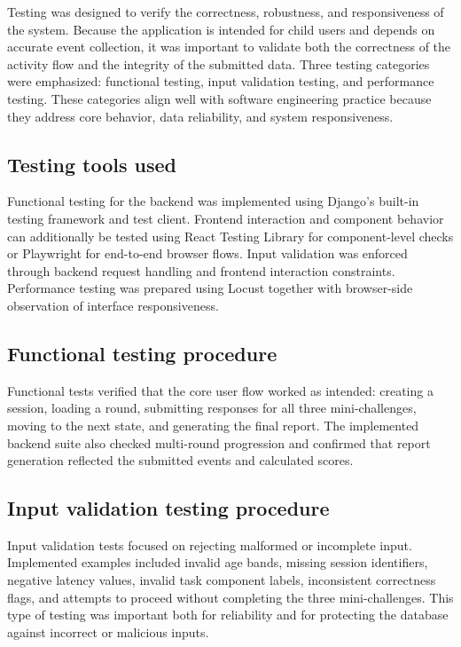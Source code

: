 \documentclass[conference]{IEEEtran}
\begin{document}
Testing was designed to verify the correctness, robustness, and responsiveness of the system. Because the application is intended for child users and depends on accurate event collection, it was important to validate both the correctness of the activity flow and the integrity of the submitted data. Three testing categories were emphasized: functional testing, input validation testing, and performance testing. These categories align well with software engineering practice because they address core behavior, data reliability, and system responsiveness.

\subsection{Testing tools used}

Functional testing for the backend was implemented using Django's built-in testing framework and test client. Frontend interaction and component behavior can additionally be tested using React Testing Library for component-level checks or Playwright for end-to-end browser flows. Input validation was enforced through backend request handling and frontend interaction constraints. Performance testing was prepared using Locust together with browser-side observation of interface responsiveness.

\subsection{Functional testing procedure}

Functional tests verified that the core user flow worked as intended: creating a session, loading a round, submitting responses for all three mini-challenges, moving to the next state, and generating the final report. The implemented backend suite also checked multi-round progression and confirmed that report generation reflected the submitted events and calculated scores.

\subsection{Input validation testing procedure}

Input validation tests focused on rejecting malformed or incomplete input. Implemented examples included invalid age bands, missing session identifiers, negative latency values, invalid task component labels, inconsistent correctness flags, and attempts to proceed without completing the three mini-challenges. This type of testing was important both for reliability and for protecting the database against incorrect or malicious inputs.
\end{document}
